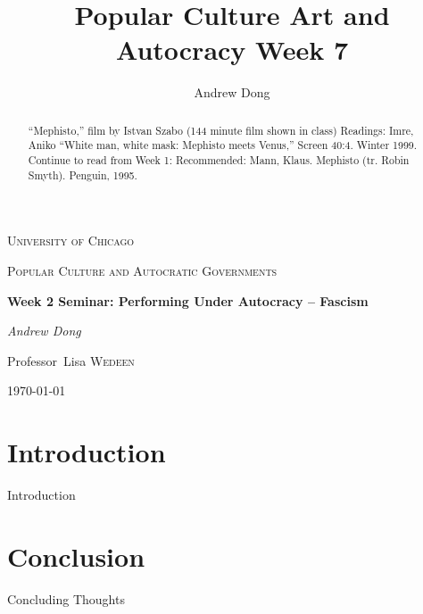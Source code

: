 \documentclass{article}
\begin{document}
\begin{titlepage}
	\centering
	{\scshape\LARGE University of Chicago \par}
	\vspace{1cm}
	{\scshape\Large Popular Culture and Autocratic Governments\par}
	\vspace{1.5cm}
	{\huge\bfseries Week 2 Seminar: Performing Under Autocracy -- Fascism \par}
	\vspace{1cm}
	{\Large\itshape Andrew Dong\par}
	\vspace{2cm}
	
	\vfill


\begin{abstract}
“Mephisto,” film by Istvan Szabo (144 minute film shown in class) 
Readings:
Imre, Aniko “White man, white mask: Mephisto meets Venus,” Screen 40:4. Winter 1999. 
Continue to read from Week 1:
Recommended: Mann, Klaus. Mephisto (tr. Robin Smyth). Penguin, 1995. 
\end{abstract}

\vfill

	Professor~Lisa \textsc{Wedeen}
	\vspace{5 mm}
	\\{\large \today\par}
\end{titlepage}

\title{Popular Culture Art and Autocracy Week 7}
\author{Andrew Dong}

\maketitle


\section{Introduction}

Introduction




\section{Conclusion}

Concluding Thoughts
\end{document}

